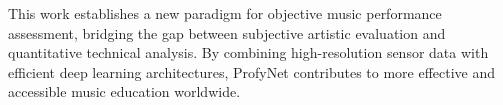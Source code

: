 This work establishes a new paradigm for objective music performance assessment, bridging the gap between subjective artistic evaluation and quantitative technical analysis.
By combining high-resolution sensor data with efficient deep learning architectures, ProfyNet contributes to more effective and accessible music education worldwide.